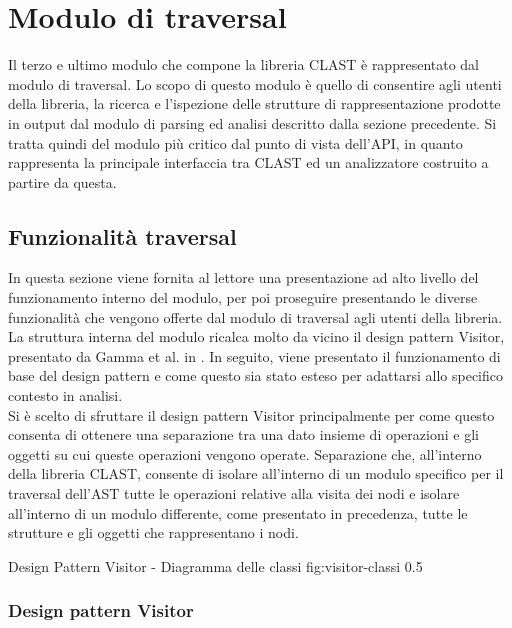\section{Modulo di traversal}

Il terzo e ultimo modulo che compone la libreria CLAST è rappresentato dal
modulo di traversal. Lo scopo di questo modulo è quello di consentire agli
utenti della libreria, la ricerca e l'ispezione delle strutture di
rappresentazione prodotte in output dal modulo di parsing ed analisi descritto
dalla sezione precedente. Si tratta quindi del modulo più critico dal punto di
vista dell'API, in quanto rappresenta la principale interfaccia tra CLAST ed
un analizzatore costruito a partire da questa.

\subsection{Funzionalità traversal}

In questa sezione viene fornita al lettore una presentazione ad alto livello
del funzionamento interno del modulo, per poi proseguire presentando le
diverse funzionalità che vengono offerte dal modulo di traversal agli utenti
della libreria.\\

La struttura interna del modulo ricalca molto da vicino il design pattern
Visitor, presentato da Gamma et al. in \cite{gamma1995design}. In seguito, viene
presentato il funzionamento di base del design pattern e come questo sia stato
esteso per adattarsi allo specifico contesto in analisi.\\

Si è scelto di sfruttare il design pattern Visitor principalmente per come
questo consenta di ottenere una separazione tra una dato insieme di operazioni
e gli oggetti su cui queste operazioni vengono operate. Separazione che,
all'interno della libreria CLAST, consente di isolare all'interno di un modulo
specifico per il traversal dell'AST tutte le operazioni relative alla visita
dei nodi e isolare all'interno di un modulo differente, come presentato in
precedenza, tutte le strutture e gli oggetti che rappresentano i nodi.

      {Design Pattern Visitor - Diagramma delle classi}
      {fig:visitor-classi}
      {0.5}

\subsubsection{Design pattern Visitor}

